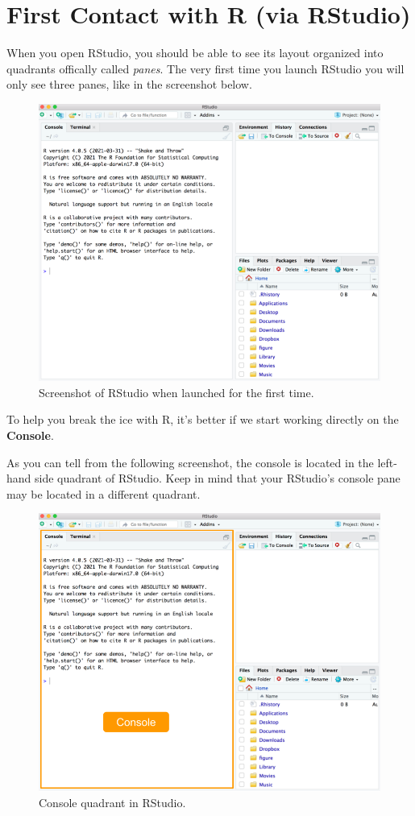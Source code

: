 \documentclass[
]{book}
\begin{document}
\hypertarget{first-contact-with-r-via-rstudio}{%
\section{First Contact with R (via RStudio)}\label{first-contact-with-r-via-rstudio}}

When you open RStudio, you should be able to see its layout organized into
quadrants offically called \emph{panes}. The very first time you launch RStudio you
will only see three panes, like in the screenshot below.

\begin{figure}

{\centering \includegraphics[width=0.7\linewidth]{images/rstudio/rstudio-launch-first-time} 

}

\caption{Screenshot of RStudio when launched for the first time.}\label{fig:unnamed-chunk-14}
\end{figure}

To help you break the ice with R, it's better if we start working directly
on the \textbf{Console}.

As you can tell from the following screenshot, the console is located in the
left-hand side quadrant of RStudio. Keep in mind that your RStudio's console
pane may be located in a different quadrant.

\begin{figure}

{\centering \includegraphics[width=0.7\linewidth]{images/rstudio/rstudio-console-first-time} 

}

\caption{Console quadrant in RStudio.}\label{fig:unnamed-chunk-15}
\end{figure}
\end{document}
